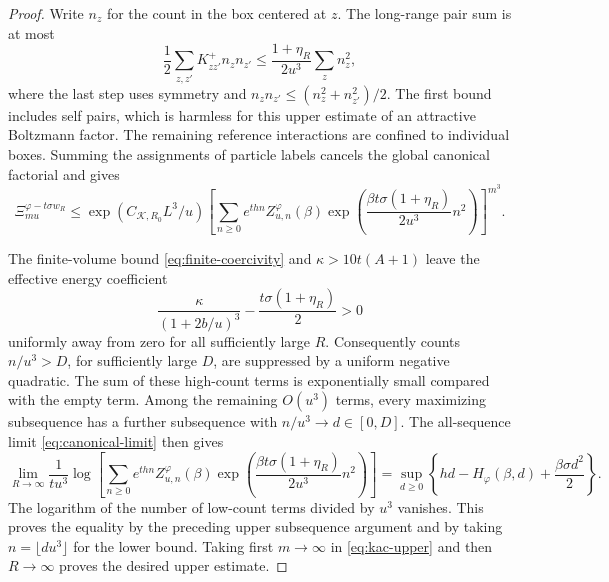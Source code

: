 \begin{proof}
Write \(n_z\) for the count in the box centered at \(z\).
The long-range pair sum is at most
\[
 \frac12\sum_{z,z'}K^+_{zz'}n_zn_{z'}
 \le \frac{1+\eta_R}{2u^3}\sum_z n_z^2,
\]
where the last step uses symmetry and
\(n_zn_{z'}\le(n_z^2+n_{z'}^2)/2\).
The first bound includes self pairs, which is harmless for this upper
estimate of an attractive Boltzmann factor.  The remaining reference
interactions are confined to individual boxes.  Summing the assignments
of particle labels cancels the global canonical factorial and gives
\begin{equation}\label{eq:kac-upper}
 \Xi_{mu}^{\varphi-t\sigma w_R}
 \le
 \exp(C_{\mathcal K,R_0}L^3/u)
 \left[
 \sum_{n\ge0}e^{thn}Z_{u,n}^{\varphi}(\beta)
 \exp\!\left(\frac{\beta t\sigma(1+\eta_R)}{2u^3}n^2\right)
 \right]^{m^3}.
\end{equation}

The finite-volume bound \eqref{eq:finite-coercivity} and
\(\kappa>10t(A+1)\) leave the effective energy coefficient
\[
 \frac{\kappa}{(1+2b/u)^3}-\frac{t\sigma(1+\eta_R)}2>0
\]
uniformly away from zero for all sufficiently large $R$. Consequently
counts \(n/u^3>D\), for sufficiently large \(D\), are suppressed by a
uniform negative quadratic.  The sum of
these high-count terms is exponentially small compared with the empty
term.  Among the remaining \(O(u^3)\) terms, every maximizing subsequence
has a further subsequence with \(n/u^3\to d\in[0,D]\).
The all-sequence limit \eqref{eq:canonical-limit} then gives
\[
 \lim_{R\to\infty}\frac1{tu^3}
 \log\!\left[
 \sum_{n\ge0}e^{thn}Z_{u,n}^{\varphi}(\beta)
 \exp\!\left(\frac{\beta t\sigma(1+\eta_R)}{2u^3}n^2\right)
 \right]
 =\sup_{d\ge0}\left\{hd-H_\varphi(\beta,d)
                         +\frac{\beta\sigma d^2}{2}\right\}.
\]
The logarithm of the number of low-count terms divided by \(u^3\)
vanishes.  This proves the equality by the preceding upper subsequence
argument and by taking \(n=\lfloor du^3\rfloor\) for the lower bound.
Taking first \(m\to\infty\) in \eqref{eq:kac-upper} and then \(R\to\infty\)
proves the desired upper estimate.


\end{proof}

